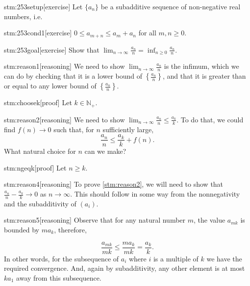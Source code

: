 \documentclass{article}
\begin{document}

\begin{stm}{stm:253setup}[exercise]
Let $\{a_n\}$ be a subadditive sequence of non-negative real numbers, i.e.
\end{stm}

\begin{stm}{stm:253cond1}[exercise]
$0 \le a_{m+n} \le a_m + a_n$ for all $m,n \ge 0$.
\end{stm}

\begin{stm}{stm:253goal}[exercise]
Show that $\lim_{n \to \infty} \frac{a_n}{n} = \inf_{n \ge 0} \frac{a_n}{n}$.
\end{stm}


\begin{stm}{stm:reason1}[reasoning]
We need to show $\lim_{n \to \infty} \frac{a_n}{n}$ is the infimum, which we can do by checking that it is a lower bound of $\left\{ \frac{a_n}{n} \right\}$, and that it is greater than or equal to any lower bound of $\left\{ \frac{a_n}{n} \right\}$.
\end{stm}

\begin{stm}{stm:choosek}[proof]
Let $k \in \mathbb{N}_+$.
\end{stm}

\begin{stm}{stm:reason2}[reasoning]
We need to show $\lim_{n \to \infty} \frac{a_n}{n} \le \frac{a_k}{k}$. To do that, we could find $f(n) \to 0$ such that, for $n$ sufficiently large, 
\[
\frac{a_n}{n} \le \frac{a_k}{k} + f(n).
\]
What natural choice for $n$ can we make?
\end{stm}

\begin{stm}{stm:ngeqk}[proof]
Let $n \ge k$.
\end{stm}

\begin{stm}{stm:reason4}[reasoning]
To prove \ref{stm:reason2}, we will need to show that $\frac{a_n}{n} - \frac{a_k}{k} \to 0$ as $n \to \infty$. This should follow in some way from the nonnegativity and the subadditivity of $(a_i)$.
\end{stm}

\begin{stm}{stm:reason5}[reasoning]
Observe that for any natural number $m$, the value $a_{mk}$ is bounded by $m a_k$, therefore,

\[
\frac{a_{mk}}{mk} \le \frac{ma_k}{mk} = \frac{a_k}{k}.
\]
In other words, for the subsequence of $a_i$ where $i$ is a multiple of $k$ we have the required convergence. And, again by subadditivity, any other element is at most $k a_1$ away from this subsequence.
\end{stm}
\end{document}
